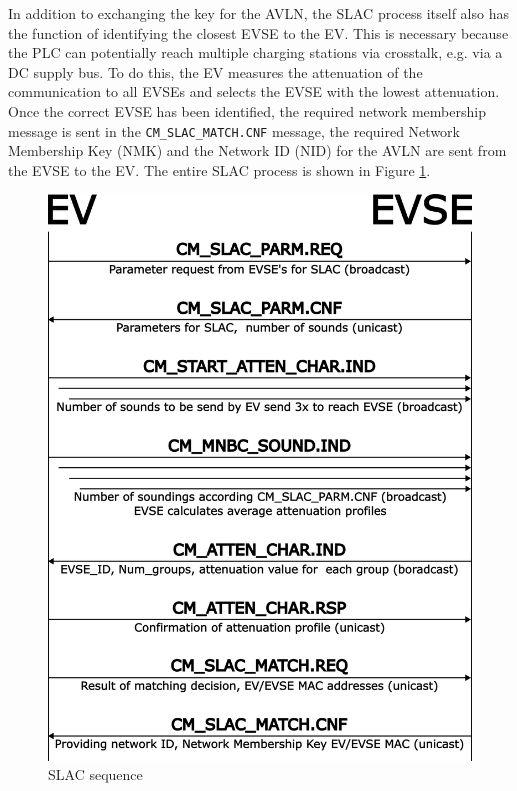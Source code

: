 \documentclass[sigconf]{acmart}
\begin{document}
In addition to exchanging the key for the AVLN, the SLAC process itself also has the function of identifying the closest EVSE to the EV. This is necessary because the PLC can potentially reach multiple charging stations via crosstalk, e.g. via a DC supply bus. To do this, the EV measures the attenuation of the communication to all EVSEs and selects the EVSE with the lowest attenuation. Once the correct EVSE has been identified, the required network membership message is sent in the \texttt{CM\_SLAC\_MATCH.CNF} message, the required Network Membership Key (NMK) and the Network ID (NID) for the AVLN are sent from the EVSE to the EV. The entire SLAC process is shown in Figure \ref{fig:slac-sequence}. \citep[pp.\,49--50]{bahrami-ev-2020} \citep[p.\,16]{homeplug-green-phy-whitepaper}

\begin{figure}[ht]
    \centering
    \includegraphics[width=1\linewidth]{graphics/SLAC_sequence_slim.png} %
    \caption{SLAC sequence \citep[p.\,50]{bahrami-ev-2020}}
    \label{fig:slac-sequence}
\end{figure}
\end{document}
